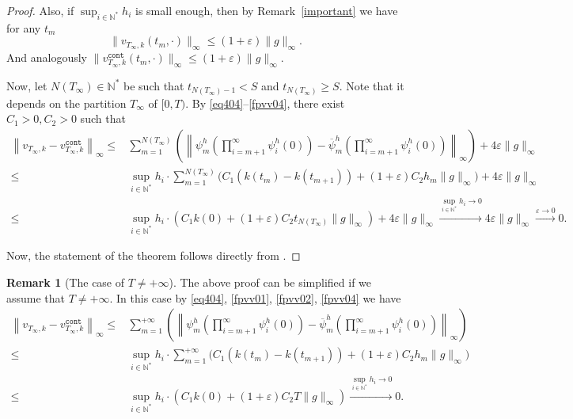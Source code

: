 \documentclass[english,openary,12pt]{article}
\theoremstyle{definition}
\newtheorem{remark}{Remark}
\newcommand{\N}{\mathbb{N}}
\begin{document}
\begin{proof}
Also, if $\sup_{i\in\N^*} h_i$ is small enough, then by Remark~\ref{important}
we have for any $t_{m}$
\begin{equation}
  \label{fpvv04}
  \|v_{T_\infty,k}(t_m,\cdot)\|_\infty \le (1+\varepsilon) \|g\|_\infty.
\end{equation}
And analogously
$\|v^{\texttt{cont}}_{T_\infty,k}(t_m,\cdot)\|_\infty \le (1+\varepsilon) \|g\|_\infty.$

Now, let $N(T_\infty) \in \N^*$ be such that 
$t_{N(T_\infty) - 1} < S$ and $t_{N(T_\infty)} \ge S$.
Note that it depends on the partition $T_\infty$ of $[0,T).$
By \eqref{eq404}--\eqref{fpvv04}, there exist 
$C_1 > 0, C_2 > 0$ such that
\begin{align*}
  \left\|
  v_{T_\infty,k} - 
  v^{\texttt{cont}}_{T_\infty,k} \right\|_\infty 
  \le&
  \sum_{m=1}^{N(T_\infty)} \left(\left\|\psi^h_m
  \left(\prod_{i = m+1}^\infty \psi^h_i (0)\right) - 
  \overline \psi^h_m \left(\prod_{i = m+1}^\infty 
  \psi^h_i (0)\right)\right\|_\infty\right) 
  + 4 \varepsilon \|g\|_\infty
  \\ 
  \le& \sup_{i\in\N^*} h_i \cdot \sum_{m=1}^{N(T_\infty)}
  \big(C_1 (k(t_m) - k(t_{m+1})) + (1+\varepsilon) C_2 h_m \|g\|_\infty\big) 
  + 4 \varepsilon \|g\|_\infty \\
  \le&
  \sup_{i\in\N^*} h_i \cdot (C_1 k(0) + 
  (1+\varepsilon) C_2 t_{N(T_\infty)} \|g\|_\infty)
  + 4 \varepsilon \|g\|_\infty
  \xrightarrow{\sup_{i\in\N^*} h_i \to 0} 
  4 \varepsilon \|g\|_\infty 
  \xrightarrow{\varepsilon \to 0} 0.
\end{align*}

Now, the statement of the theorem follows directly from
\cite[Proposition~4.3]{Sor17}.
\end{proof}

\begin{remark}[The case of $T \neq +\infty$]
The above proof can be simplified if we assume that $T \neq +\infty$. 
In this case by 
\eqref{eq404}, \eqref{fpvv01}, \eqref{fpvv02}, \eqref{fpvv04} we have
\begin{align*}
  \left\|
  v_{T_\infty,k} - v^{\texttt{cont}}_{T_\infty,k} 
  \right\|_\infty 
  \le&
  \sum_{m=1}^{+\infty} \left(\left\|\psi^h_m
  \left(\prod_{i = m+1}^\infty \psi^h_i (0)\right) - 
  \overline \psi^h_m \left(\prod_{i = m+1}^\infty 
  \psi^h_i (0)\right)\right\|_\infty\right) \\
  \le& \sup_{i\in\N^*} h_i \cdot \sum_{m=1}^{+\infty}
  \big(C_1 (k(t_m) - k(t_{m+1})) + 
  (1+\varepsilon) C_2 h_m \|g\|_\infty\big) \\
  \le& \sup_{i\in\N^*} h_i \cdot (C_1 k(0) + 
  (1+\varepsilon) C_2 T \|g\|_\infty)
  \xrightarrow{\sup_{i\in\N^*} h_i \to 0} 0.
\end{align*}
\end{remark}
\end{document}
